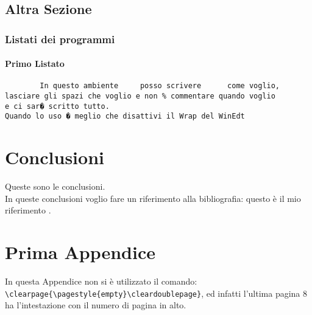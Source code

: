 \documentclass[12pt,a4paper,openright,twoside]{report}
\renewcommand{\chaptermark}[1]{\markboth{\thechapter.\ #1}{}}
\begin{document}
\section{Altra Sezione}\label{sec:prova}%
\subsection{Listati dei programmi}
\subsubsection{Primo Listato}
\begin{verbatim}
        In questo ambiente     posso scrivere      come voglio,
lasciare gli spazi che voglio e non % commentare quando voglio
e ci sar� scritto tutto.
Quando lo uso � meglio che disattivi il Wrap del WinEdt
\end{verbatim}
\clearpage{\pagestyle{empty}\cleardoublepage}
\chapter*{Conclusioni}
 Queste sono le
conclusioni.\\
In queste conclusioni voglio fare un riferimento alla
bibliografia: questo \`e il mio riferimento \cite{K3,K4}.
\renewcommand{\chaptermark}[1]{\markright{\thechapter \ #1}{}}
\lhead[\fancyplain{}{\bfseries\thepage}]{\fancyplain{}{\bfseries\rightmark}}
\appendix                               %
\chapter{Prima Appendice}               %
In questa Appendice non si \`e utilizzato il comando:\\
\verb"\clearpage{\pagestyle{empty}\cleardoublepage}", ed infatti
l'ultima pagina 8 ha l'intestazione con il numero di pagina in
alto.
\end{document}
